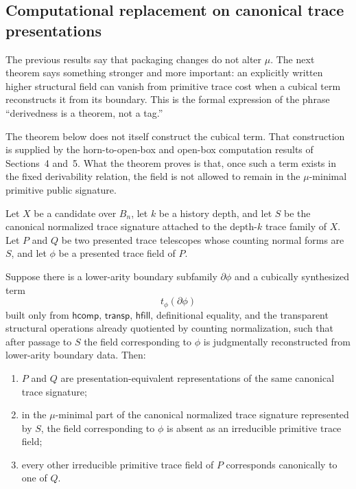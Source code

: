 \subsection{Computational replacement on canonical trace presentations}

The previous results say that packaging changes do not alter \(\mu\).  The next theorem says
something stronger and more important: an explicitly written higher structural field can
vanish from primitive trace cost when a cubical term reconstructs it from its boundary.
This is the formal expression of the phrase ``derivedness is a theorem, not a tag.''

The theorem below does not itself construct the cubical term.  That construction is supplied
by the horn-to-open-box and open-box computation results of Sections~4 and~5.  What the
theorem proves is that, once such a term exists in the fixed derivability relation, the field is
not allowed to remain in the \(\mu\)-minimal primitive public signature.

\begin{theorem}
Let \(X\) be a candidate over \(B_n\), let \(k\) be a history depth, and let \(S\) be the
canonical normalized trace signature attached to the depth-\(k\) trace family of \(X\).  Let
\(P\) and \(Q\) be two presented trace telescopes whose counting normal forms are \(S\), and
let \(\phi\) be a presented trace field of \(P\).

Suppose there is a lower-arity boundary subfamily \(\partial\phi\) and a cubically synthesized
term
\[
  t_\phi(\partial\phi)
\]
built only from \(\mathsf{hcomp}\), \(\mathsf{transp}\), \(\mathsf{hfill}\), definitional
equality, and the transparent structural operations already quotiented by counting
normalization, such that after passage to \(S\) the field corresponding to \(\phi\) is
judgmentally reconstructed from lower-arity boundary data.  Then:
\begin{enumerate}
\item \(P\) and \(Q\) are presentation-equivalent representations of the same canonical trace
signature;
\item in the \(\mu\)-minimal part of the canonical normalized trace signature represented by
\(S\), the field corresponding to \(\phi\) is absent as an irreducible primitive trace field;
\item every other irreducible primitive trace field of \(P\) corresponds canonically to one of
\(Q\).
\end{enumerate}
\end{theorem}

